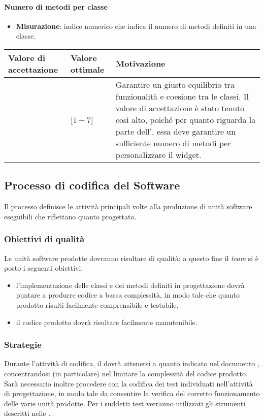 \paragraph{Numero di metodi per classe}

\begin{itemize}
\item \textbf{Misurazione}: indice numerico che indica il numero di metodi definiti in una classe.
\end{itemize}


\begin{center}
\begin{tabular}{|P{2.5cm}|P{2.5cm}|P{6cm}|}
		\hline
			\textbf{Valore di accettazione}	& \textbf{Valore ottimale} & \textbf{Motivazione} \\
			\hline
			[$1 - 15$] & [$1 - 7$] &	Garantire un giusto equilibrio tra funzionalità e coesione tra le classi. Il valore di accettazione è stato tenuto così alto, poiché per quanto riguarda la parte dell', essa deve garantire un sufficiente numero di metodi per personalizzare il widget. \\
			\hline
			\end{tabular}
\end{center}

\subsection{Processo di codifica del Software}
Il processo definisce le attività principali volte alla produzione di unità software eseguibili che riflettano quanto progettato.

\subsubsection{Obiettivi di qualità}
Le unità software prodotte dovranno risultare di qualità; a questo fine il \textit{team} si è posto i seguenti obiettivi:
\begin{itemize}
\item l'implementazione delle classi e dei metodi definiti in progettazione dovrà puntare a produrre codice a bassa complessità, in modo tale che quanto prodotto risulti facilmente comprensibile e testabile.
\item il codice prodotto dovrà risultare facilmente manutenibile.
\end{itemize}
\subsubsection{Strategie}
Durante l'attività di codifica, il \textit{\Progr} dovrà attenersi a quanto indicato nel documento \textit{\DDP}, concentrandosi (in particolare) nel limitare la complessità del codice prodotto. Sarà necessario inoltre procedere con la codifica dei test individuati nell'attività di progettazione, in modo tale da consentire la verifica del corretto funzionamento delle varie unità prodotte. Per i suddetti test verranno utilizzati gli strumenti descritti nelle \NdP.
